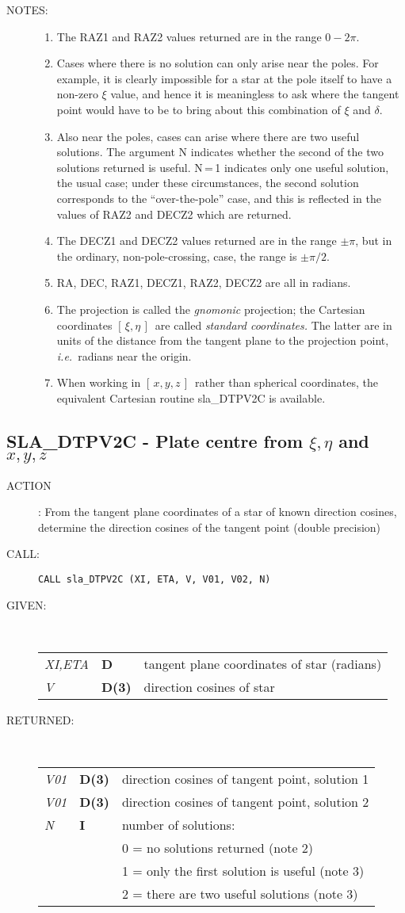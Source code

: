 \documentclass[11pt,twoside]{article}
\newcommand{\xlabel}[1]{}
\newcommand{\xieta}     {$[\,\xi,\eta\,]$}
\newcommand{\xyz}       {$[\,x,y,z\,]$}
\newcommand{\routine}[3]
{\hbadness=10000
  \vbox
  {
    \rule{\textwidth}{0.3mm}\\
    {\Large {\bf #1} \hfill #2 \hfill {\bf #1}}\\
    \setlength{\oldspacing}{\topsep}
    \setlength{\topsep}{0.3ex}
    \begin{description}
      #3
    \end{description}
    \setlength{\topsep}{\oldspacing}
  }
}
\renewcommand{\routine}[3]
   {
      \subsection{#1\xlabel{#1} - #2\label{#1}}
       \begin{description}
         #3
       \end{description}
   }
\newcommand{\action}[1]
{\item[ACTION]: #1}
\newcommand{\action}[1]
   {\item[ACTION:] #1}
\newcommand{\call}[1]
{\item[CALL]: \hspace{0.4em}{\tt #1}}
\newlength{\oldspacing}
\renewcommand{\call}[1]
   {
    \item[CALL:] {\tt #1}
   }
\newcommand{\args}[2]
{
  \goodbreak
  \setlength{\oldspacing}{\topsep}
  \setlength{\topsep}{0.3ex}
  \begin{description}
  \item[#1]:\\[1.5ex]
    \begin{tabular}{p{7em}p{6em}p{22em}}
      #2
    \end{tabular}
  \end{description}
  \setlength{\topsep}{\oldspacing}
}
\renewcommand{\args}[2]
   {
     \begin{description}
        \item[#1:]\\
        \begin{tabular}{p{7em}p{6em}l}
           #2
        \end{tabular}
     \end{description}
   }
\newcommand{\spec}[3]
{
  {\em {#1}} & {\bf \mbox{#2}} & {#3}
}
\newcommand{\notes}[1]
{
  \goodbreak
  \setlength{\oldspacing}{\topsep}
  \setlength{\topsep}{0.3ex}
  \begin{description}
    \item[NOTES]:
        #1
  \end{description}
  \setlength{\topsep}{\oldspacing}
}
\renewcommand{\notes}[1]
   {
      \begin{description}
         \item[NOTES:]
            #1
      \end{description}
   }
\begin{document}
\notes
{
 \begin{enumerate}
  \item The RAZ1 and RAZ2 values returned are in the range $0\!-\!2\pi$.
  \item Cases where there is no solution can only arise near the poles.
        For example, it is clearly impossible for a star at the pole
        itself to have a non-zero $\xi$ value, and hence it is
        meaningless to ask where the tangent point would have to be
        to bring about this combination of $\xi$ and $\delta$.
  \item Also near the poles, cases can arise where there are two useful
        solutions.  The argument N indicates whether the second of the
        two solutions returned is useful.  N\,=\,1
        indicates only one useful solution, the usual case;  under
        these circumstances, the second solution corresponds to the
        ``over-the-pole'' case, and this is reflected in the values
        of RAZ2 and DECZ2 which are returned.
  \item The DECZ1 and DECZ2 values returned are in the range $\pm\pi$,
        but in the ordinary, non-pole-crossing, case, the range is
        $\pm\pi/2$.
  \item RA, DEC, RAZ1, DECZ1, RAZ2, DECZ2 are all in radians.
  \item The projection is called the {\it gnomonic}\/ projection;  the
        Cartesian coordinates \xieta\ are called 
        {\it standard coordinates.}\/  The latter
        are in units of the distance from the tangent plane to the projection
        point, {\it i.e.}\ radians near the origin.
  \item When working in \xyz\ rather than spherical coordinates, the
        equivalent Cartesian routine sla\_DTPV2C is available.
 \end{enumerate}
}
\routine{SLA\_DTPV2C}{Plate centre from $\xi,\eta$ and $x,y,z$}
{
 \action{From the tangent plane coordinates of a star of known
         direction cosines, determine the direction cosines
         of the tangent point (double precision)}
 \call{CALL sla\_DTPV2C (XI, ETA, V, V01, V02, N)}
}
\args{GIVEN}
{
 \spec{XI,ETA}{D}{tangent plane coordinates of star (radians)} \\
 \spec{V}{D(3)}{direction cosines of star}
}
\args{RETURNED}
{
 \spec{V01}{D(3)}{direction cosines of tangent point, solution 1} \\
 \spec{V01}{D(3)}{direction cosines of tangent point, solution 2} \\
 \spec{N}{I}{number of solutions:} \\
 \spec{}{}{\hspace{1em} 0 = no solutions returned  (note 2)} \\
 \spec{}{}{\hspace{1em} 1 = only the first solution is useful (note 3)} \\
 \spec{}{}{\hspace{1em} 2 = there are two useful solutions (note 3)}
}
\end{document}
